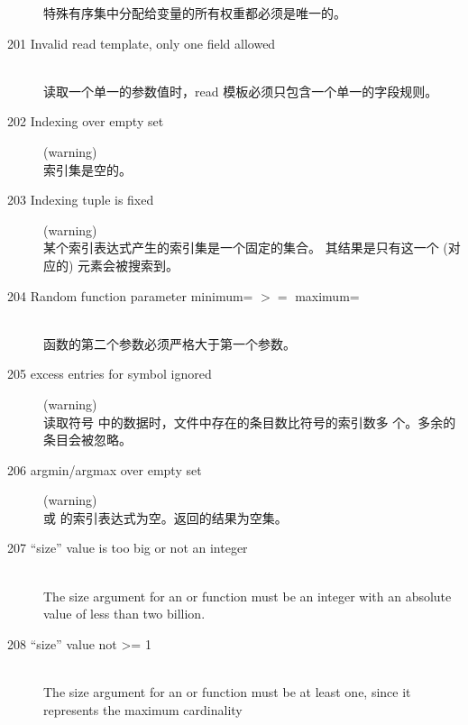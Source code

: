 \begin{description}
  特殊有序集中分配给变量的所有权重都必须是唯一的。
\item[201 Invalid read template, only one field allowed]\ \\
  读取一个单一的参数值时，read 模板必须只包含一个单一的字段规则。
\item[202 Indexing over empty set] (warning)\ \\
  索引集是空的。
\item[203 Indexing tuple is fixed] (warning)\ \\
  某个索引表达式产生的索引集是一个固定的集合。
  其结果是只有这一个 (对应的) 元素会被搜索到。
\item[204 Random function parameter minimum= \code{xxx} $>=$ maximum=
  \code{yyy}]\ \\
   函数的第二个参数必须严格大于第一个参数。
\item[205 \code{xxx} excess entries for symbol \code{yyy} ignored ]
  (warning)\ \\
  读取符号  中的数据时，文件中存在的条目数比符号的索引数多 
   个。多余的条目会被忽略。
\item[206 argmin/argmax over empty set] (warning)\ \\
   或  的索引表达式为空。返回的结果为空集。
\item[207 ``size'' value \code{xxx} is too big or not an integer]\ \\
   The size argument for an  or  function
   must be an integer with an absolute value of less than two billion.
\item[208 ``size'' value \code{xxx} not >= 1]\ \\
   The size argument for an  or  function
   must be at least one, since it represents the maximum cardinality

\end{description}

